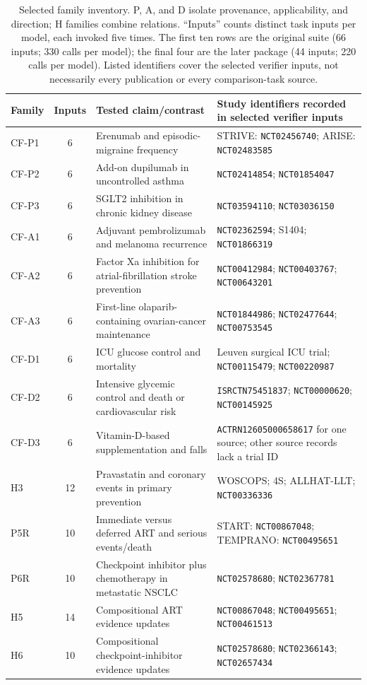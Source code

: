 \documentclass[11pt]{article}
\begin{document}
\begin{table}[t]
\centering
\footnotesize
\begin{tabularx}{\textwidth}{@{}l c X X@{}}
\toprule
Family & Inputs & Tested claim/contrast & Study identifiers recorded in selected verifier inputs \\
\midrule
CF-P1 & 6 & Erenumab and episodic-migraine frequency & STRIVE: \texttt{NCT02456740}; ARISE: \texttt{NCT02483585} \\
CF-P2 & 6 & Add-on dupilumab in uncontrolled asthma & \texttt{NCT02414854}; \texttt{NCT01854047} \\
CF-P3 & 6 & SGLT2 inhibition in chronic kidney disease & \texttt{NCT03594110}; \texttt{NCT03036150} \\
CF-A1 & 6 & Adjuvant pembrolizumab and melanoma recurrence & \texttt{NCT02362594}; S1404; \texttt{NCT01866319} \\
CF-A2 & 6 & Factor Xa inhibition for atrial-fibrillation stroke prevention & \texttt{NCT00412984}; \texttt{NCT00403767}; \texttt{NCT00643201} \\
CF-A3 & 6 & First-line olaparib-containing ovarian-cancer maintenance & \texttt{NCT01844986}; \texttt{NCT02477644}; \texttt{NCT00753545} \\
CF-D1 & 6 & ICU glucose control and mortality & Leuven surgical ICU trial; \texttt{NCT00115479}; \texttt{NCT00220987} \\
CF-D2 & 6 & Intensive glycemic control and death or cardiovascular risk & \texttt{ISRCTN75451837}; \texttt{NCT00000620}; \texttt{NCT00145925} \\
CF-D3 & 6 & Vitamin-D-based supplementation and falls & \texttt{ACTRN12605000658617} for one source; other source records lack a trial ID \\
H3 & 12 & Pravastatin and coronary events in primary prevention & WOSCOPS; 4S; ALLHAT-LLT; \texttt{NCT00336336} \\
\midrule
P5R & 10 & Immediate versus deferred ART and serious events/death & START: \texttt{NCT00867048}; TEMPRANO: \texttt{NCT00495651} \\
P6R & 10 & Checkpoint inhibitor plus chemotherapy in metastatic NSCLC & \texttt{NCT02578680}; \texttt{NCT02367781} \\
H5 & 14 & Compositional ART evidence updates & \texttt{NCT00867048}; \texttt{NCT00495651}; \texttt{NCT00461513} \\
H6 & 10 & Compositional checkpoint-inhibitor evidence updates & \texttt{NCT02578680}; \texttt{NCT02366143}; \texttt{NCT02657434} \\
\bottomrule
\end{tabularx}
\caption{Selected family inventory. P, A, and D isolate provenance, applicability, and direction; H families combine relations. ``Inputs'' counts distinct task inputs per model, each invoked five times. The first ten rows are the original suite (66 inputs; 330 calls per model); the final four are the later package (44 inputs; 220 calls per model). Listed identifiers cover the selected verifier inputs, not necessarily every publication or every comparison-task source.}
\label{tab:family-inventory}
\end{table}
\end{document}
